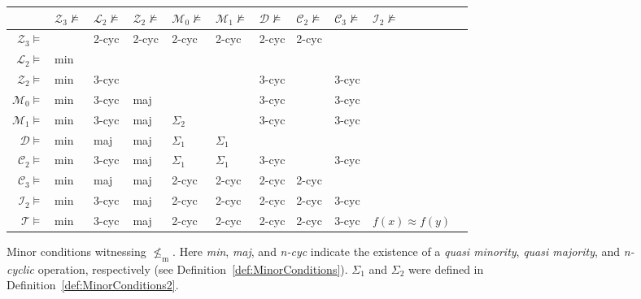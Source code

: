 \documentclass[12pt]{amsart}
\theoremstyle{definition}
\theoremstyle{definition}
\newcommand{\clo}[1]{\mathcal{#1}}
\newcommand{\notisaminorof}{\nleq_{\mathrm{m}}}
\begin{document}
\begin{figure}[ht]

\centering\begin{tabular}{r|llllllllll}
& $\clo{Z}_3 \not \models$ & $\clo{L}_2 \not \models$ & $\clo{Z}_2 \not \models$ & $\clo{M}_0 \not \models$ & $\clo{M}_1 \not \models$ & $\clo{D} \not \models$ & $\clo{C}_2 \not \models$ & $\clo{C}_3 \not \models$ & $\clo{I}_2 \not \models$  \\
\hline
$\clo{Z}_3 \models $ & & 2-cyc & 2-cyc & 2-cyc & 2-cyc & 2-cyc & 2-cyc &  & & \\
$\clo{L}_2 \models $ & min & &  &  &  &  &  &  &  & \\
$\clo{Z}_2 \models $ & min & 3-cyc & &  &  & 3-cyc &  & 3-cyc &  & \\
$\clo{M}_0 \models $ & min & 3-cyc & maj &  &  & 3-cyc &  & 3-cyc &  & \\
$\clo{M}_1 \models $ & min & 3-cyc & maj & $\Sigma_2$ &  & 3-cyc &  & 3-cyc &  & \\
$\clo{D} \models $ & min & maj & maj & $\Sigma_1$ & $\Sigma_1$ &  &  &  &  & \\
$\clo{C}_2 \models $ & min & 3-cyc & maj &  $\Sigma_1$ &  $\Sigma_1$ & 3-cyc &  & 3-cyc &  & \\ 
$\clo{C}_3 \models $ & min & maj & maj & 2-cyc & 2-cyc & 2-cyc & 2-cyc &  &  & \\
$\clo{I}_2 \models $ & min & 3-cyc & maj & 2-cyc & 2-cyc & 2-cyc & 2-cyc & 3-cyc &  & \\
$\clo{T} \models $ & min & 3-cyc & maj & 2-cyc & 2-cyc & 2-cyc & 2-cyc & 3-cyc & $f(x) \approx f(y)$ & 
\end{tabular}

\caption{Minor conditions witnessing $\notisaminorof$. Here \emph{min}, \emph{maj}, and \emph{n-cyc} indicate the existence of a \emph{quasi minority}, \emph{quasi majority}, and \emph{n-cyclic} operation, respectively (see Definition~\ref{def:MinorConditions}). $\Sigma_1$ and $\Sigma_2$ were defined in Definition~\ref{def:MinorConditions2}.}
\label{fig:Separations}
\end{figure}
\end{document}
